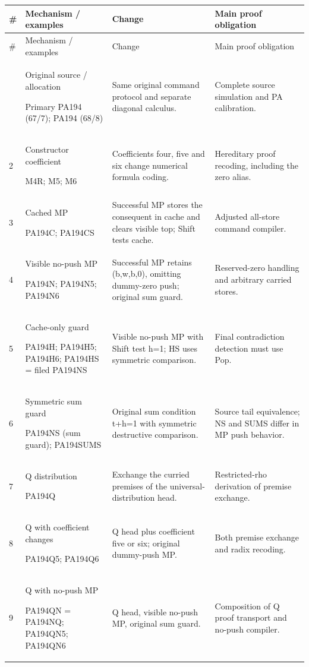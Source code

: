 \begingroup\small
\begin{longtable}{p{0.25in}>{\raggedright\arraybackslash}p{1.55in}>{\raggedright\arraybackslash}p{2.10in}>{\raggedright\arraybackslash}p{2.00in}}
\toprule
\# & Mechanism / examples & Change & Main proof obligation\\
\midrule\endfirsthead
\toprule
\# & Mechanism / examples & Change & Main proof obligation\\
\midrule\endhead
\bottomrule\endfoot
1&Original source / allocation\par Primary PA194 (67/7); PA194 (68/8)&Same original command protocol and separate diagonal calculus.&Complete source simulation and PA calibration.\\[0.5em]
2&Constructor coefficient\par M4R; M5; M6&Coefficients four, five and six change numerical formula coding.&Hereditary proof recoding, including the zero alias.\\[0.5em]
3&Cached MP\par PA194C; PA194CS&Successful MP stores the consequent in cache and clears visible top; Shift tests cache.&Adjusted all-store command compiler.\\[0.5em]
4&Visible no-push MP\par PA194N; PA194N5; PA194N6&Successful MP retains (b,w,b,0), omitting dummy-zero push; original sum guard.&Reserved-zero handling and arbitrary carried stores.\\[0.5em]
5&Cache-only guard\par PA194H; PA194H5; PA194H6; PA194HS = filed PA194NS&Visible no-push MP with Shift test h=1; HS uses symmetric comparison.&Final contradiction detection must use Pop.\\[0.5em]
6&Symmetric sum guard\par PA194NS (sum guard); PA194SUMS&Original sum condition t+h=1 with symmetric destructive comparison.&Source tail equivalence; NS and SUMS differ in MP push behavior.\\[0.5em]
7&Q distribution\par PA194Q&Exchange the curried premises of the universal-distribution head.&Restricted-rho derivation of premise exchange.\\[0.5em]
8&Q with coefficient changes\par PA194Q5; PA194Q6&Q head plus coefficient five or six; original dummy-push MP.&Both premise exchange and radix recoding.\\[0.5em]
9&Q with no-push MP\par PA194QN = PA194NQ; PA194QN5; PA194QN6&Q head, visible no-push MP, original sum guard.&Composition of Q proof transport and no-push compiler.\\[0.5em]

\end{longtable}
